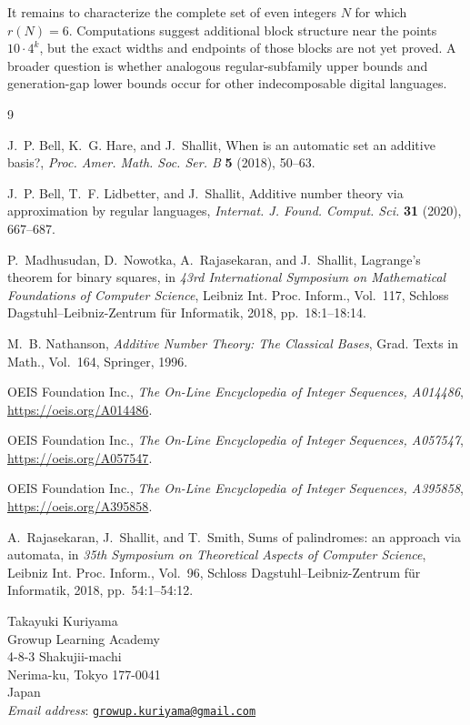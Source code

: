 \documentclass[12pt]{article}
\theoremstyle{plain}
\theoremstyle{definition}
\theoremstyle{plain}
\begin{document}
It remains to characterize the complete set of even integers $N$ for which
$r(N)=6$.  Computations suggest additional block structure near the points
$10\cdot4^k$, but the exact widths and endpoints of those blocks are not yet
proved.  A broader question is whether analogous regular-subfamily upper
bounds and generation-gap lower bounds occur for other indecomposable digital
languages.

\begin{thebibliography}{9}

J.~P. Bell, K.~G. Hare, and J.~Shallit,
When is an automatic set an additive basis?,
\emph{Proc. Amer. Math. Soc. Ser. B} \textbf{5} (2018), 50--63.

J.~P. Bell, T.~F. Lidbetter, and J.~Shallit,
Additive number theory via approximation by regular languages,
\emph{Internat. J. Found. Comput. Sci.} \textbf{31} (2020), 667--687.

P.~Madhusudan, D.~Nowotka, A.~Rajasekaran, and J.~Shallit,
Lagrange's theorem for binary squares,
in \emph{43rd International Symposium on Mathematical Foundations of
Computer Science}, Leibniz Int. Proc. Inform., Vol.~117, Schloss
Dagstuhl--Leibniz-Zentrum f{\"u}r Informatik, 2018, pp.~18:1--18:14.

M.~B. Nathanson,
\emph{Additive Number Theory: The Classical Bases},
Grad. Texts in Math., Vol.~164, Springer, 1996.

OEIS Foundation Inc.,
\emph{The On-Line Encyclopedia of Integer Sequences, A014486},
\url{https://oeis.org/A014486}.

OEIS Foundation Inc.,
\emph{The On-Line Encyclopedia of Integer Sequences, A057547},
\url{https://oeis.org/A057547}.

OEIS Foundation Inc.,
\emph{The On-Line Encyclopedia of Integer Sequences, A395858},
\url{https://oeis.org/A395858}.

A.~Rajasekaran, J.~Shallit, and T.~Smith,
Sums of palindromes: an approach via automata,
in \emph{35th Symposium on Theoretical Aspects of Computer Science},
Leibniz Int. Proc. Inform., Vol.~96, Schloss Dagstuhl--Leibniz-Zentrum
f{\"u}r Informatik, 2018, pp.~54:1--54:12.

\end{thebibliography}


\begin{flushleft}
Takayuki Kuriyama\\
Growup Learning Academy\\
4-8-3 Shakujii-machi\\
Nerima-ku, Tokyo 177-0041\\
Japan\\
\textit{Email address}: \href{mailto:growup.kuriyama@gmail.com}
{\texttt{growup.kuriyama@gmail.com}}
\end{flushleft}
\end{document}

